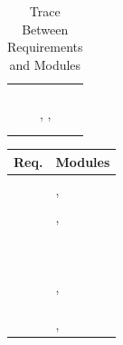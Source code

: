 \documentclass[12pt, titlepage]{article}
\begin{document}
\begin{table}[H]
\begin{tabular}{p{} p{}}
\nameref{PERF_007}& \\
\nameref{PERF_008}& \nameref{Firmware} \\
\nameref{DES_001}& \\
\nameref{STD_001}& \\
\nameref{STD_002}& \nameref{Drone Camera}, \nameref{Operator Camera}, \nameref{Message Socket} \\
\nameref{SEC_001}& \nameref{User Interface} \\
\nameref{SEC_002}& \nameref{User Interface} \\
\bottomrule
\end{tabular}
\caption{Trace Between Requirements and Modules}
\end{table}

\begin{table}[H]
\centering
\begin{tabular}{p{} p{}}
\toprule
\textbf{Req.} & \textbf{Modules}\\
\midrule
\nameref{MTNC_001}&  \\
\nameref{MTNC_002}& \nameref{Operation States}, \nameref{Firmware} \\
\nameref{MTNC_003}& \\
\nameref{SAFE_001}& \nameref{Operation States}, \nameref{Firmware} \\
\nameref{SAFE_002}& \nameref{User Interface} \\
\nameref{SAFE_003}& \nameref{Operation States} \\
\nameref{SAFE_004}& \nameref{Operation States} \\
\nameref{SAFE_005}& \\
\nameref{USE_001}& \nameref{User Interface} \\
\nameref{USE_002}&  \nameref{User Interface} \\
\nameref{USE_003}& \\
\nameref{USE_004}& \\
\nameref{USE_005}&  \nameref{User Interface} \\
\nameref{SR_002}& \nameref{User Interface} \\
\nameref{SR_003}& \nameref{Operations Manager}, \nameref{User Interface} \\
\nameref{SR_004}& \\
\nameref{SR_005}& \\
\nameref{SR_006}&  \\
\nameref{SR_007}&  \nameref{User Interface}, \nameref{Operation States} \\

\end{tabular}
\end{table}
\end{document}
